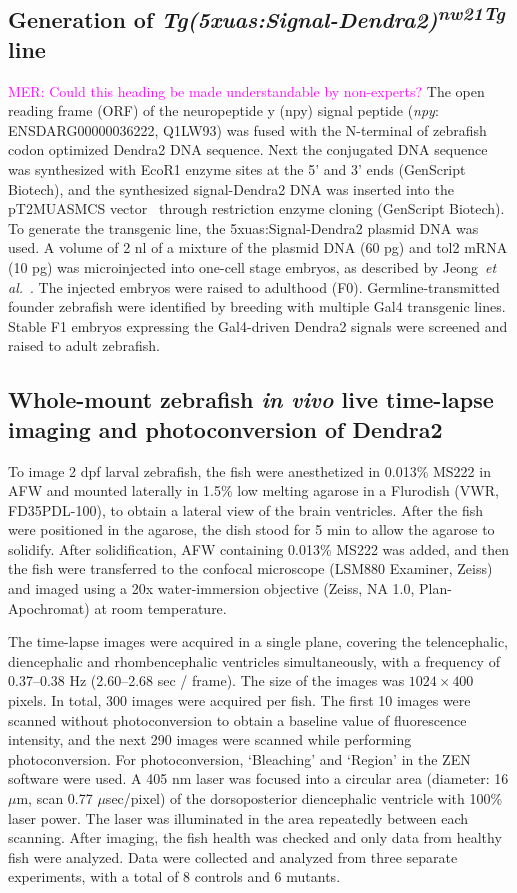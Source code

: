 \documentclass[fleqn]{wlscirep}
\newcommand{\mer}[1]{\textcolor{magenta}{#1}}
\begin{document}
\subsection*{Generation of \emph{Tg(5xuas:Signal-Dendra2)\textsuperscript{nw21Tg}} line}
\mer{MER: Could this heading be made understandable by non-experts?}
The open reading frame (ORF) of the neuropeptide y (npy) signal peptide (\emph{npy}: ENSDARG00000036222, Q1LW93) was fused with the N-terminal of zebrafish codon optimized Dendra2 DNA sequence. Next the conjugated DNA sequence was synthesized with EcoR1 enzyme sites at the 5’ and 3’ ends (GenScript Biotech), and the synthesized signal-Dendra2 DNA was inserted into the pT2MUASMCS vector~\cite{Asakawa2008GeneticZebrafish} through restriction enzyme cloning (GenScript Biotech).  To generate the transgenic line, the 5xuas:Signal-Dendra2 plasmid DNA was used. A volume of 2 nl of a mixture of the plasmid DNA (60 pg) and tol2 mRNA (10 pg) was microinjected into one-cell stage embryos, as described by Jeong~\emph{et al.}~\cite{Jeong2024TheZebrafish}. The injected embryos were raised to adulthood (F0). Germline-transmitted founder zebrafish were identified by breeding with multiple Gal4 transgenic lines. Stable F1 embryos expressing the Gal4-driven Dendra2 signals were screened and raised to adult zebrafish.

\subsection*{Whole-mount zebrafish \emph{in vivo} live time-lapse imaging and photoconversion of Dendra2}
To image 2 dpf larval zebrafish, the fish were anesthetized in 0.013\% MS222 in AFW and mounted laterally in 1.5\% low melting agarose in a Flurodish (VWR, FD35PDL-100), to obtain a lateral view of the brain ventricles. After the fish were positioned in the agarose, the dish stood for 5 min to allow the agarose to solidify. After solidification, AFW containing 0.013\% MS222 was added, and then the fish were transferred to the confocal microscope (LSM880 Examiner, Zeiss) and imaged using a 20x water-immersion objective (Zeiss, NA 1.0, Plan-Apochromat) at room temperature.

The time-lapse images were acquired in a single plane, covering the telencephalic, diencephalic and rhombencephalic ventricles simultaneously, with a frequency of 0.37--0.38 Hz (2.60--2.68 sec / frame). The size of the images was $1024\times400$ pixels. In total, 300 images were acquired per fish. The first 10 images were scanned without photoconversion to obtain a baseline value of fluorescence intensity, and the next 290 images were scanned while performing photoconversion. For photoconversion, ‘Bleaching’ and ‘Region’ in the ZEN software were used. A 405 nm laser was focused into a circular area (diameter: 16 $\mu$m, scan 0.77 $\mu$sec/pixel) of the dorsoposterior diencephalic ventricle with 100\% laser power. The laser was illuminated in the area repeatedly between each scanning. After imaging, the fish health was checked and only data from healthy fish were analyzed.
Data were collected and analyzed from three separate experiments, with a total of 8 controls and 6 mutants.
\end{document}
